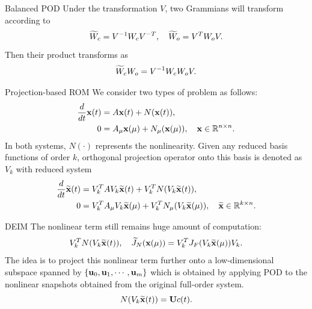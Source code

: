 \documentclass{beamer}
\begin{document}
\begin{frame}{Balanced POD}
	Under the transformation $V$, two Grammians will transform according to
	\begin{equation*}
		\widetilde W_c = V^{-1}W_cV^{-T}, \quad \widetilde W_o = V^{T}W_oV.
	\end{equation*}
	Then their product transforms as 
	\begin{equation*}
		\widetilde W_cW_o = V^{-1}W_cW_oV.
	\end{equation*}
\end{frame}

\begin{frame}{Projection-based ROM}
	We consider two types of problem as follows:
	\begin{equation*}
		\begin{aligned}
			\frac{d}{dt}\mathbf{x}(t) & = A\mathbf{x}(t) + N(\mathbf{x}(t)),\\
			0 & = A_{\mu}\mathbf{x}(\mu) + N_{\mu}(\mathbf{x}(\mu)), \quad \mathbf{x} \in \mathbb{R}^{n\times n}.
		\end{aligned}
	\end{equation*}
	In both systems, $N(\cdot)$ represents the nonlinearity. Given any reduced basis functions of order $k$, 
	orthogonal projection operator onto this basis is denoted as $V_k$ with reduced system
	\begin{equation*}
		\begin{aligned}
			\frac{d}{dt}\widetilde{\mathbf{x}}(t) & = V_k^T A V_k\widetilde{\mathbf{x}}(t) + V_k^T N(V_k\widetilde{\mathbf{x}}(t)),\\
			0 & = V_k^T A_{\mu} V_k\widetilde{\mathbf{x}}(\mu) + V_k^T N_{\mu}(V_k\widetilde{\mathbf{x}}(\mu)), \quad \widetilde{\mathbf{x}} \in \mathbb{R}^{k\times n}.
		\end{aligned}
	\end{equation*}
\end{frame}

\begin{frame}{DEIM}
	The nonlinear term still remains huge amount of computation:
	\begin{equation*}
		V_k^T N(V_k\widetilde{\mathbf{x}}(t)), \quad \widetilde J_N(\mathbf{x}(\mu)) = V_k^T J_F(V_k\widetilde{\mathbf{x}}(\mu))V_k.
	\end{equation*}
	The idea is to project this nonlinear term further onto a low-dimensional subspace spanned by $\left\{ \mathbf{u}_0, \mathbf{u}_1, \cdots, \mathbf{u}_m \right\}$
	which is obtained by applying POD to the nonlinear snapshots obtained from the original full-order system.
	\begin{equation*}
		N(V_k\widetilde{\mathbf{x}}(t)) = \mathbf{U} c(t).
	\end{equation*}
\end{frame}
\end{document}
